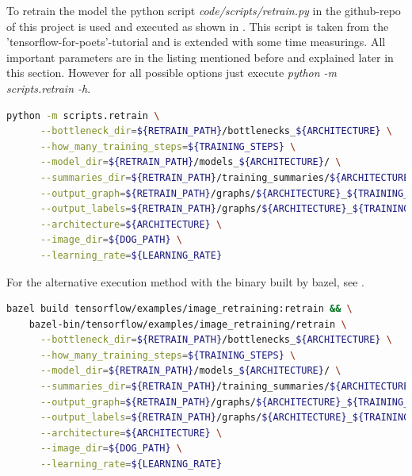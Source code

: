 To retrain the model the python script \textit{code/scripts/retrain.py} in the github-repo of this project is used and executed as shown in . This script is taken from the 'tensorflow-for-poets'-tutorial and is extended with some time measurings. All important parameters are in the listing mentioned before and explained later in this section. However for all possible options just execute \textit{python -m scripts.retrain -h}. 

\begin{minipage}{\linewidth}
\begin{lstlisting}[caption=Call of \textit{retrain.py}, label=list:retrain, language=bash]
	python -m scripts.retrain \
	  --bottleneck_dir=${RETRAIN_PATH}/bottlenecks_${ARCHITECTURE} \
	  --how_many_training_steps=${TRAINING_STEPS} \
	  --model_dir=${RETRAIN_PATH}/models_${ARCHITECTURE}/ \
	  --summaries_dir=${RETRAIN_PATH}/training_summaries/${ARCHITECTURE}_${TRAINING_STEPS}/${ARCHITECTURE}_${TRAINING_STEPS}_${LEARNING_RATE} \
	  --output_graph=${RETRAIN_PATH}/graphs/${ARCHITECTURE}_${TRAINING_STEPS}/retrained_dog_graph_${ARCHITECTURE}_${TRAINING_STEPS}_${LEARNING_RATE}.pb \
	  --output_labels=${RETRAIN_PATH}/graphs/${ARCHITECTURE}_${TRAINING_STEPS}/retrained_dog_labels_${ARCHITECTURE}_${TRAINING_STEPS}_${LEARNING_RATE}.txt \
	  --architecture=${ARCHITECTURE} \
	  --image_dir=${DOG_PATH} \
	  --learning_rate=${LEARNING_RATE}
\end{lstlisting}
\end{minipage}

For the alternative execution method with the binary built by bazel, see \listref{bretrain}.

\begin{minipage}{\linewidth}
\begin{lstlisting}[caption=Build and call of \textit{retrain}, label=list:bretrain, language=bash]
	bazel build tensorflow/examples/image_retraining:retrain && \
	bazel-bin/tensorflow/examples/image_retraining/retrain \
	  --bottleneck_dir=${RETRAIN_PATH}/bottlenecks_${ARCHITECTURE} \
	  --how_many_training_steps=${TRAINING_STEPS} \
	  --model_dir=${RETRAIN_PATH}/models_${ARCHITECTURE}/ \
	  --summaries_dir=${RETRAIN_PATH}/training_summaries/${ARCHITECTURE}_${TRAINING_STEPS}/${ARCHITECTURE}_${TRAINING_STEPS}_${LEARNING_RATE} \
	  --output_graph=${RETRAIN_PATH}/graphs/${ARCHITECTURE}_${TRAINING_STEPS}/retrained_dog_graph_${ARCHITECTURE}_${TRAINING_STEPS}_${LEARNING_RATE}.pb \
	  --output_labels=${RETRAIN_PATH}/graphs/${ARCHITECTURE}_${TRAINING_STEPS}/retrained_dog_labels_${ARCHITECTURE}_${TRAINING_STEPS}_${LEARNING_RATE}.txt \
	  --architecture=${ARCHITECTURE} \
	  --image_dir=${DOG_PATH} \
	  --learning_rate=${LEARNING_RATE}
\end{lstlisting}
\end{minipage}

